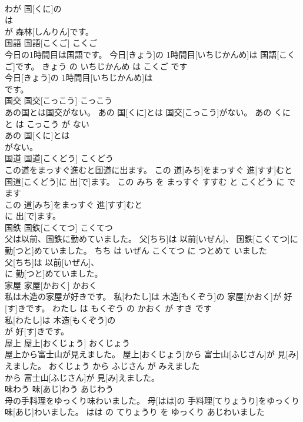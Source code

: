 \documentclass[8pt]{extreport}
\begin{document}
\begin{CJK}{UTF8}{min}
\\	わが 国[くに]の
\\	は 
\\	[ななじゅっぱーせんと]が 森林[しんりん]です。			
\\	国語	国語[こくご]	こくご	
\\	今日の1時間目は国語です。	今日[きょう]の 1時間目[いちじかんめ]は 国語[こくご]です。	きょう の いちじかんめ は こくご です	
\\	今日[きょう]の 1時間目[いちじかんめ]は
\\	です。			
\\	国交	国交[こっこう]	こっこう	
\\	あの国とは国交がない。	あの 国[くに]とは 国交[こっこう]がない。	あの くに と は こっこう が ない	
\\	あの 国[くに]とは
\\	がない。			
\\	国道	国道[こくどう]	こくどう	
\\	この道をまっすぐ進むと国道に出ます。	この 道[みち]をまっすぐ 進[すす]むと 国道[こくどう]に 出[で]ます。	この みち を まっすぐ すすむ と こくどう に でます	
\\	この 道[みち]をまっすぐ 進[すす]むと
\\	に 出[で]ます。			
\\	国鉄	国鉄[こくてつ]	こくてつ	
\\	父は以前、国鉄に勤めていました。	父[ちち]は 以前[いぜん]、 国鉄[こくてつ]に 勤[つと]めていました。	ちち は いぜん こくてつ に つとめて いました	
\\	父[ちち]は 以前[いぜん]、
\\	に 勤[つと]めていました。			
\\	家屋	家屋[かおく]	かおく	
\\	私は木造の家屋が好きです。	私[わたし]は 木造[もくぞう]の 家屋[かおく]が 好[す]きです。	わたし は もくぞう の かおく が すき です	
\\	私[わたし]は 木造[もくぞう]の
\\	が 好[す]きです。			
\\	屋上	屋上[おくじょう]	おくじょう	
\\	屋上から富士山が見えました。	屋上[おくじょう]から 富士山[ふじさん]が 見[み]えました。	おくじょう から ふじさん が みえました	
\\	から 富士山[ふじさん]が 見[み]えました。			
\\	味わう	味[あじ]わう	あじわう	
\\	母の手料理をゆっくり味わいました。	母[はは]の 手料理[てりょうり]をゆっくり 味[あじ]わいました。	はは の てりょうり を ゆっくり あじわいました	

\end{CJK}
\end{document}
